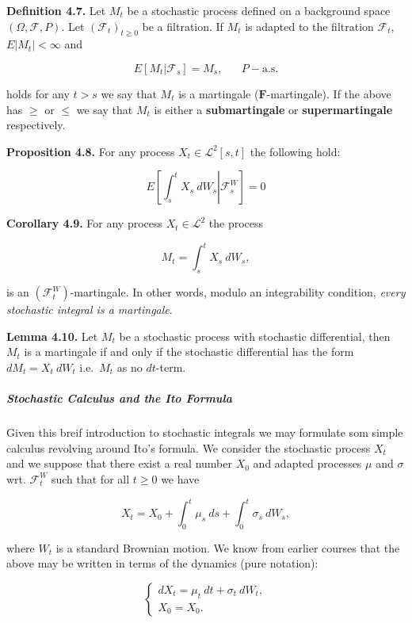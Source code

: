 \documentclass[
]{article}
\begin{document}
\textbf{Definition 4.7.} Let \(M_t\) be a stochastic process defined on
a background space \((\Omega,\mathcal{F},P)\). Let
\((\mathcal{F}_t)_{t\ge 0}\) be a filtration. If \(M_t\) is adapted to
the filtration \(\mathcal{F}_t\), \(E\vert M_t\vert <\infty\) and

\[E[M_t\vert \mathcal{F}_s]=M_s,\hspace{20pt}P-\text{a.s.}\]

holds for any \(t>s\) we say that \(M_t\) is a martingale
(\(\mathbf{F}\)-martingale). If the above has \(\ge\) or \(\le\) we say
that \(M_t\) is either a \textbf{submartingale} or
\textbf{supermartingale} respectively.

\textbf{Proposition 4.8.} For any process \(X_t\in\mathcal{L}^2[s,t]\)
the following hold:

\[
E\left[\left.\int_s^t X_s\ dW_s\right\vert\mathcal{F}_s^W\right]=0
\]

\textbf{Corollary 4.9.} For any process \(X_t\in\mathcal{L}^2\) the
process

\[
M_t=\int_s^t X_s\ dW_s,
\]

is an \((\mathcal{F}_t^W)\)-martingale. In other words, modulo an
integrability condition, \emph{every stochastic integral is a
martingale}.

\textbf{Lemma 4.10.} Let \(M_t\) be a stochastic process with stochastic
differential, then \(M_t\) is a martingale if and only if the stochastic
differential has the form \(dM_t=X_t\ dW_t\) i.e.~\(M_t\) as no
\(dt\)-term.

\hypertarget{stochastic-calculus-and-the-ito-formula}{%
\subparagraph{Stochastic Calculus and the Ito
Formula}\label{stochastic-calculus-and-the-ito-formula}}

Given this breif introduction to stochastic integrals we may formulate
som simple calculus revolving around Ito's formula. We consider the
stochastic process \(X_t\) and we suppose that there exist a real number
\(X_0\) and adapted processes \(\mu\) and \(\sigma\) wrt.
\(\mathcal{F}_t^W\) such that for all \(t\ge0\) we have

\[
X_t=X_0+\int_0^t\mu_s\ ds+\int_0^t\sigma_s\ dW_s,\tag{4.16}
\]

where \(W_t\) is a standard Brownian motion. We know from earlier
courses that the above may be written in terms of the dynamics (pure
notation):

\[
\left\{\begin{matrix}dX_t=\mu_t\ dt+\sigma_t\ dW_t,\\ X_0=X_0.\end{matrix}\right.
\]
\end{document}
